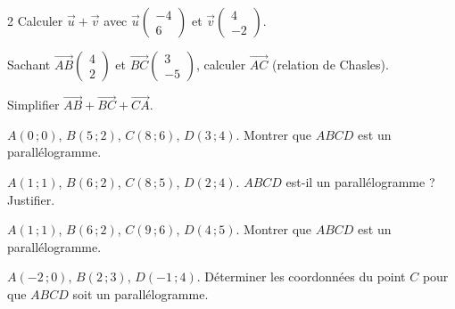 \begin{multicols}{2}
\exo{} Calculer $\vec u+\vec v$ avec $\vec u\begin{pmatrix}-4\\6\end{pmatrix}$ et
$\vec v\begin{pmatrix}4\\-2\end{pmatrix}$.

\exo{} Sachant $\vec{AB}\begin{pmatrix}4\\2\end{pmatrix}$ et
$\vec{BC}\begin{pmatrix}3\\-5\end{pmatrix}$, calculer $\vec{AC}$ (relation de Chasles).

\exo{} Simplifier $\vec{AB}+\vec{BC}+\vec{CA}$.

\exo{} $A(0\,;0)$, $B(5\,;2)$, $C(8\,;6)$, $D(3\,;4)$. Montrer que $ABCD$ est un
parallélogramme.

\exo{} $A(1\,;1)$, $B(6\,;2)$, $C(8\,;5)$, $D(2\,;4)$. $ABCD$ est-il un
parallélogramme ? Justifier.

\exo{} $A(1\,;1)$, $B(6\,;2)$, $C(9\,;6)$, $D(4\,;5)$. Montrer que $ABCD$ est un
parallélogramme.

\exo{} $A(-2\,;0)$, $B(2\,;3)$, $D(-1\,;4)$. Déterminer les coordonnées du point
$C$ pour que $ABCD$ soit un parallélogramme.

\end{multicols}


